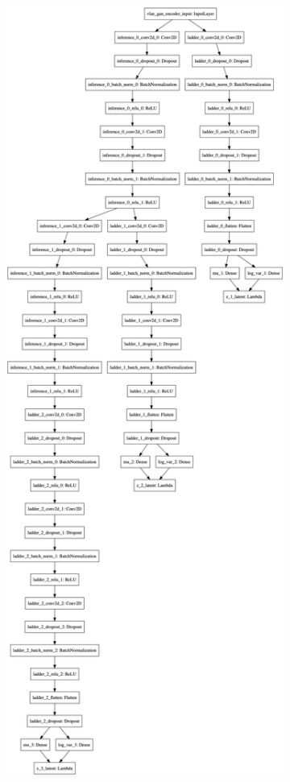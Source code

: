 \begin{figure}
    \centering
    \begin{subfigure}{.5\textwidth}
        \centering
        \includegraphics[width=\textwidth,height=.85\textheight,keepaspectratio]{images/vlae/encoder.png}

\end{subfigure}
\end{figure}

